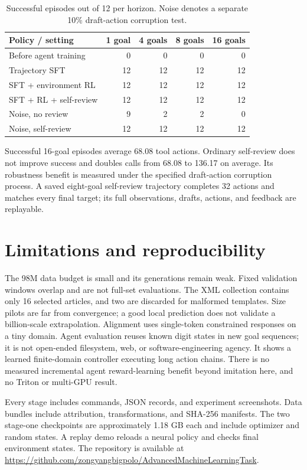 \documentclass{article}
\begin{document}
\begin{table}[t]
\centering
\caption{Successful episodes out of 12 per horizon. Noise denotes a
separate 10\% draft-action corruption test.}
\begin{tabular}{lrrrr}
\toprule
Policy / setting & 1 goal & 4 goals & 8 goals & 16 goals\\
\midrule
Before agent training & 0 & 0 & 0 & 0\\
Trajectory SFT & 12 & 12 & 12 & 12\\
SFT + environment RL & 12 & 12 & 12 & 12\\
SFT + RL + self-review & 12 & 12 & 12 & 12\\
Noise, no review & 9 & 2 & 2 & 0\\
Noise, self-review & 12 & 12 & 12 & 12\\
\bottomrule
\end{tabular}
\end{table}
Successful 16-goal episodes average 68.08 tool actions. Ordinary
self-review does not improve success and doubles calls from 68.08 to
136.17 on average. Its robustness benefit is measured under the specified
draft-action corruption process.
A saved eight-goal self-review trajectory completes 32 actions and
matches every final target; its full observations, drafts, actions,
and feedback are replayable.

\section{Limitations and reproducibility}

The 98M data budget is small and its generations remain weak.
Fixed validation windows overlap and are not full-set evaluations.
The XML collection contains only 16 selected articles, and two are
discarded for malformed templates. Size pilots are far from
convergence; a good local prediction does not validate a billion-scale
extrapolation. Alignment uses single-token constrained responses on
a tiny domain. Agent evaluation reuses known digit states in new goal
sequences; it is not open-ended filesystem, web, or software-engineering
agency. It shows a learned finite-domain controller executing long
action chains. There is no measured incremental agent reward-learning
benefit beyond imitation here, and no Triton or multi-GPU result.

Every stage includes commands, JSON records, and experiment screenshots.
Data bundles include attribution,
transformations, and SHA-256 manifests. The two stage-one checkpoints
are approximately 1.18 GB each and include optimizer and random states.
A replay demo reloads a neural policy and checks final environment states.
The repository is available at
\url{https://github.com/zongyangbigpolo/AdvancedMachineLearningTask}.
\end{document}
